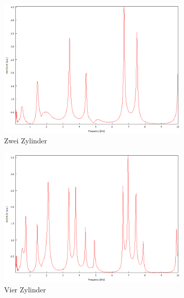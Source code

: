 \begin{figure}
  \centering
  \begin{subfigure}{0.4\textwidth}
    \centering
    \includegraphics[width=\textwidth]{Bilder/Zylinderketten/rein_2.png}
    \caption{Zwei Zylinder}
  \end{subfigure}
  \begin{subfigure}{0.4\textwidth}
    \centering
    \includegraphics[width=\textwidth]{Bilder/Zylinderketten/rein_4.png}
    \caption{Vier Zylinder}
  \end{subfigure}
  \begin{subfigure}{0.4\textwidth}
    \centering

\end{subfigure}
\end{figure}
